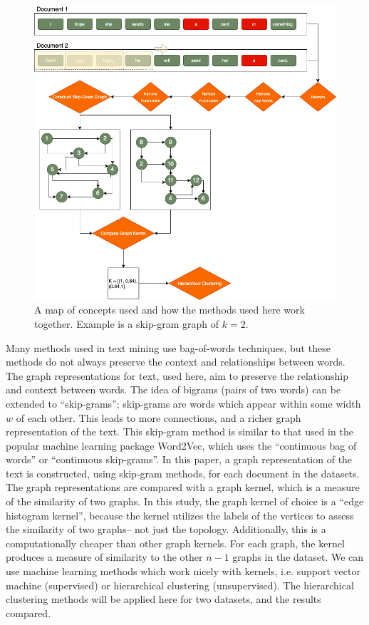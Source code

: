 \begin{figure}
 \includegraphics[width=6in]{Content/Images/Concept_map.png}
 \caption{A map of concepts used and how the methods used here work together. Example is a skip-gram graph of $k=2$.}
 \end{figure}

\hspace*{0.3cm} Many methods used in text mining use bag-of-words techniques, but these methods do not always preserve the context and relationships between words. The graph representations for text, used here, aim to preserve the relationship and context between words. The idea of bigrams (pairs of two words) can be extended to ``skip-grams”; skip-grams are words which appear within some width $w$ of each other. This leads to more connections, and a richer graph representation of the text. This skip-gram method is similar to that used in the popular machine learning package Word2Vec, which uses the “continuous bag of words” or ``continuous skip-grams”. In this paper, a graph representation of the text is constructed, using skip-gram methods, for each document in the datasets. \\

The graph representations are compared with a graph kernel, which is a measure of the similarity of two graphs. In this study, the graph kernel of choice is a ``edge histogram kernel”, because the kernel utilizes the labels of the vertices to assess the similarity of two graphs– not just the topology. Additionally, this is a computationally cheaper than other graph kernels. For each graph, the kernel produces a measure of similarity to the other $n-1$ graphs in the dataset. We can use machine learning methods which work nicely with kernels, i.e. support vector machine (supervised) or hierarchical clustering (unsupervised). The hierarchical clustering methods will be applied here for two datasets, and the results compared.\\

